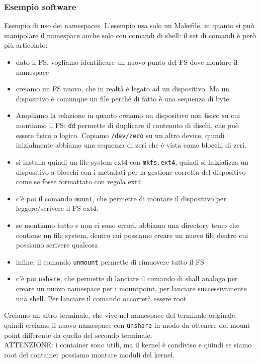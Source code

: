 \documentclass[12pt, oneside]{extbook}
\begin{document}
\subsubsection{Esempio software}
Esempio di uso dei namespaces. L'esempio usa solo un Makefile, in quanto si può manipolare il namespace anche solo con comandi di shell: il set di comandi è però più articolato:
\begin{itemize}
\item dato il FS, vogliamo identificare un nuovo punto del FS dove montare il namespace
\item creiamo un FS nuovo, che in realtà è legato ad un dispositivo. Ma un dispositivo è comunque un file perché di fatto è una sequenza di byte.
\item Ampliamo la relazione in quanto creiamo un dispositivo non fisico su cui montiamo il FS: \texttt{dd} permette di duplicare il contenuto di dischi, che può essere fisico o logico. Copiamo \texttt{/dev/zero} su un altro device, quindi inizialmente abbiamo una sequenza di zeri che è vista come blocchi di zeri.
\item si installa quindi un file system ext4 con \texttt{mkfs.ext4}, quindi si inizializza un dispositivo a blocchi con i metadati per la gestione corretta del dispositivo come se fosse formattato con regola ext4
\item c'è poi il comando \texttt{mount}, che permette di montare il dispositivo per leggere/scrivere il FS ext4.
\item se montiamo tutto e non ci sono errori, abbiamo una directory temp che contiene un file system, dentro cui possiamo creare un nuovo file dentro cui possiamo scrivere qualcosa
\item infine, il comando \texttt{unmount} permette di rimuovere tutto il FS
\item c'è poi \texttt{ushare}, che permette di lanciare il comando di shall analogo per creare un nuovo namespace per i mountpoint, per lanciare successivamente una shell. Per lanciare il comando occorrerà essere root
\end{itemize}
Creiamo un altro terminale, che vive nel namespace del terminale originale, quindi creiamo il nuovo namespace con \texttt{unshare} in modo da ottenere dei mount point differente da quello del secondo terminale.\\ATTENZIONE: i container sono utili, ma il kernel è condiviso e quindi se siamo root del container possiamo montare moduli del kernel.
\end{document}
